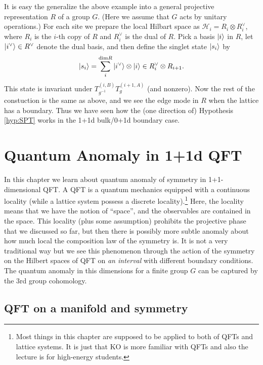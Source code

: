 \documentclass[
]{scrartcl}
\numberwithin{equation}{section}
\theoremstyle{definition}
\theoremstyle{definition}
\theoremstyle{definition}
\theoremstyle{definition}
\theoremstyle{remark}
\begin{document}
It is easy the generalize the above example into a general projective representation \(R\) of a group \(G\). (Here we assume that \(G\) acts by unitary operations.)
For each site we prepare the local Hilbart space as \(\mathcal{H}_i = R_i \otimes R^\vee_i\), where \(R_i\) is the \(i\)-th copy of \(R\) and \(R^\vee_i\) is the dual of \(R\).
Pick a basis \(\ket{i}\) in \(R\), let \(\ket{i^\vee} \in R^\vee\) denote the dual basis, and then define the singlet state \(\ket{s_i}\) by
\begin{equation}
  \label{eq:ketsiGeneral}
  \ket{s_i} = \sum_{i}^{\mathrm{dim}R} \ket{i^\vee}\otimes\ket{i}\in R_{i}^\vee \otimes R_{i+1}.
\end{equation}
This state is invariant under \(T_{g^{-1}}^{(i,B)}T_g^{(i+1,A)}\) (and nonzero).
Now the rest of the constuction is the same as above, and we see the edge mode in \(R\) when the lattice has a boundary.
Thus we have seen how the (one direction of) Hypothesis \ref{hyp:SPT} works in the 1+1d bulk/0+1d boundary case.

\hypertarget{quantum-anomaly-in-11d-qft}{%
\section{Quantum Anomaly in 1+1d QFT}\label{quantum-anomaly-in-11d-qft}}

In this chapter we learn about quantum anomaly of symmetry in 1+1-dimensional QFT. A QFT is a quantum mechanics equipped with a continuous locality (while a lattice system possess a discrete locality).\footnote{Most things in this chapter are supposed to be applied to both of QFTs and lattice systems. It is just that KO is more familiar with QFTs and also the lecture is for high-energy students.} Here, the locality means that we have the notion of ``space'', and the observables are contained in the space.
This locality (plus some assumption) prohibits the projective phase that we discussed so far, but then there is possibly more subtle anomaly about how much local the composition law of the symmetry is.
It is not a very traditional way but we see this phenomenon through the action of the symmetry on the Hilbert spaces of QFT on \emph{an interval} with different boundary conditions. The quantum anomaly in this dimensions for a finite group \(G\) can be captured by the 3rd group cohomology.

\hypertarget{qft-on-a-manifold-and-symmetry}{%
\subsection{QFT on a manifold and symmetry}\label{qft-on-a-manifold-and-symmetry}}
\end{document}
